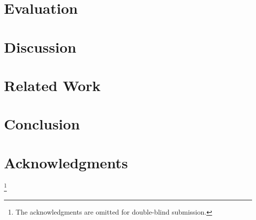 \documentclass[conference]{IEEEtran}
\begin{document}
\section{Evaluation} 
\label{sec:evaluation}


\section{Discussion}
\label{sec:discussion}



\section{Related Work}
\label{sec:relatedwork}


\section{Conclusion}
\label{sec:conc}


\section*{Acknowledgments}
\thanks{The acknowledgments are omitted for double-blind submission.}




\end{document}
